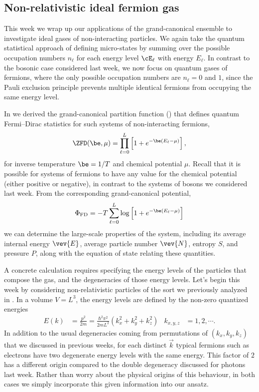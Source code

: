 \subsection{\label{sec:fermi_nonrel}Non-relativistic ideal fermion gas}
This week we wrap up our applications of the grand-canonical ensemble to investigate ideal gases of non-interacting particles.
We again take the quantum statistical approach of defining micro-states by summing over the possible occupation numbers $n_{\ell}$ for each energy level $\cE_{\ell}$ with energy $E_{\ell}$.
In contrast to the bosonic case considered last week, we now focus on quantum gases of fermions, where the only possible occupation numbers are $n_{\ell} = 0$ and $1$, since the Pauli exclusion principle prevents multiple identical fermions from occupying the same energy level.

In  we derived the grand-canonical partition function () that defines quantum Fermi--Dirac statistics for such systems of non-interacting fermions,
\begin{equation*}
  \ZFD(\be, \mu) = \prod_{\ell = 0}^L \left[1 + e^{-\be (E_{\ell} - \mu)}\right],
\end{equation*}
for inverse temperature $\be = 1 / T$ and chemical potential $\mu$.
Recall that it is possible for systems of fermions to have any value for the chemical potential (either positive or negative), in contrast to the systems of bosons we considered last week.
From the corresponding grand-canonical potential,
\begin{equation*}
  \Phi_{\text{FD}} = -T \sum_{\ell = 0}^L \log\left[1 + e^{-\be (E_{\ell} - \mu)}\right]
\end{equation*}
we can determine the large-scale properties of the system, including its average internal energy $\vev{E}$, average particle number $\vev{N}$, entropy $S$, and pressure $P$, along with the equation of state relating these quantities.

A concrete calculation requires specifying the energy levels of the particles that compose the gas, and the degeneracies of those energy levels.
Let's begin this week by considering non-relativistic particles of the sort we previously analyzed in .
In a volume $V = L^3$, the energy levels are defined by the non-zero quantized energies
\begin{align*}
  E(k) & = \frac{p^2}{2m} = \frac{\hbar^2 \pi^2}{2mL^2}\left(k_x^2 + k_y^2 + k_z^2\right) &
  k_{x, y, z} & = 1, 2, \cdots.
\end{align*}
In addition to the usual degeneracies coming from permutations of $(k_x, k_y, k_z)$ that we discussed in previous weeks, for each distinct $\vec k$ typical fermions such as electrons have two degenerate energy levels with the same energy.
This factor of $2$ has a different origin compared to the double degeneracy discussed for photons last week.
Rather than worry about the physical origins of this behaviour, in both cases we simply incorporate this given information into our ansatz. %

